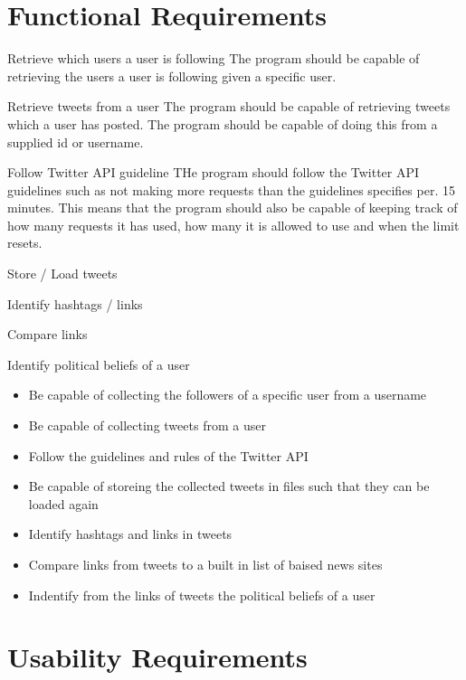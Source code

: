 \section{Functional Requirements}

\begin{requirement}{Retrieve which users a user is following}
The program should be capable of retrieving the users a user is
following given a specific user.
\end{requirement}

\begin{requirement}{Retrieve tweets from a user}
The program should be capable of retrieving tweets which a user has posted. The
program should be capable of doing this from a supplied id or username.
\end{requirement}

\begin{requirement}{Follow Twitter \ac{API} guideline}
THe program should follow the Twitter \ac{API} guidelines such as not making
more requests than the guidelines specifies per. 15 minutes. This means that the
program should also be capable of keeping track of how many requests it has
used, how many it is allowed to use and when the limit resets.
\end{requirement}

\begin{requirement}{Store / Load tweets}

\end{requirement}

\begin{requirement}{Identify hashtags / links}

\end{requirement}

\begin{requirement}{Compare links}

\end{requirement}

\begin{requirement}{Identify political beliefs of a user }

\end{requirement}
\begin{itemize}
 \item Be capable of collecting the followers of a specific user from a username
 \item Be capable of collecting tweets from a user
 \item Follow the guidelines and rules of the Twitter API
 \item Be capable of storeing the collected tweets in files such that they can
 be loaded again
 \item Identify hashtags and links in tweets
 \item Compare links from tweets to a built in list of baised news sites
 \item Indentify from the links of tweets the political beliefs of a user
\end{itemize}

\section{Usability Requirements}
